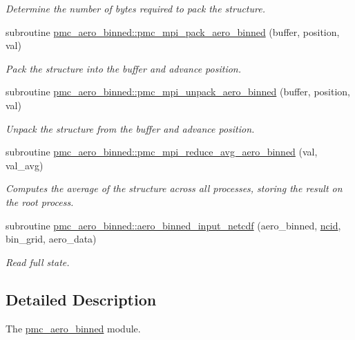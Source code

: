 \begin{DoxyCompactItemize}
\begin{DoxyCompactList}\small\item\em Determine the number of bytes required to pack the structure. \end{DoxyCompactList}\item 
subroutine \mbox{\hyperlink{namespacepmc__aero__binned_a9c4ceab5200a5fafdc12aba7197b2b6c}{pmc\+\_\+aero\+\_\+binned\+::pmc\+\_\+mpi\+\_\+pack\+\_\+aero\+\_\+binned}} (buffer, position, val)
\begin{DoxyCompactList}\small\item\em Pack the structure into the buffer and advance position. \end{DoxyCompactList}\item 
subroutine \mbox{\hyperlink{namespacepmc__aero__binned_a1bb5126495a6f8750883d78879ab92b6}{pmc\+\_\+aero\+\_\+binned\+::pmc\+\_\+mpi\+\_\+unpack\+\_\+aero\+\_\+binned}} (buffer, position, val)
\begin{DoxyCompactList}\small\item\em Unpack the structure from the buffer and advance position. \end{DoxyCompactList}\item 
subroutine \mbox{\hyperlink{namespacepmc__aero__binned_ad66424e22af470ba715c405a5a3e39bf}{pmc\+\_\+aero\+\_\+binned\+::pmc\+\_\+mpi\+\_\+reduce\+\_\+avg\+\_\+aero\+\_\+binned}} (val, val\+\_\+avg)
\begin{DoxyCompactList}\small\item\em Computes the average of the structure across all processes, storing the result on the root process. \end{DoxyCompactList}\item 
subroutine \mbox{\hyperlink{namespacepmc__aero__binned_a57434f98c66167e2832149ad51cfdcaa}{pmc\+\_\+aero\+\_\+binned\+::aero\+\_\+binned\+\_\+input\+\_\+netcdf}} (aero\+\_\+binned, \mbox{\hyperlink{fractal_8_f90_a4e89f3f850921ff84a6dfce8b166ad50}{ncid}}, bin\+\_\+grid, aero\+\_\+data)
\begin{DoxyCompactList}\small\item\em Read full state. \end{DoxyCompactList}\end{DoxyCompactItemize}


\subsection{Detailed Description}
The \mbox{\hyperlink{namespacepmc__aero__binned}{pmc\+\_\+aero\+\_\+binned}} module. 

